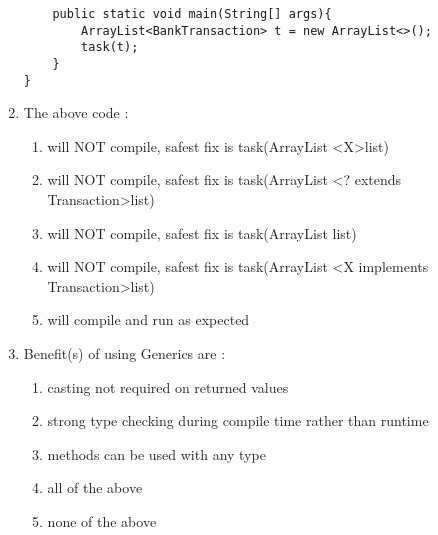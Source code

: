 \documentclass{article}
\begin{document}
\begin{enumerate}
\begin{lstlisting}
	public static void main(String[] args){
		ArrayList<BankTransaction> t = new ArrayList<>();
		task(t);
	}
}
	\end{lstlisting}
	\item The above code :
	\begin{enumerate}
		\item will NOT compile, safest fix is task(ArrayList \textless X\textgreater list)
		\item will NOT compile, safest fix is task(ArrayList \textless ? extends Transaction\textgreater list)
		\item will NOT compile, safest fix is task(ArrayList list)
		\item will NOT compile, safest fix is task(ArrayList \textless X implements Transaction\textgreater list)
		\item will compile and run as expected
	\end{enumerate}
	\item Benefit(s) of using Generics are :
	\begin{enumerate}
		\item casting not required on returned values
		\item strong type checking during compile time rather than runtime
		\item methods can be used with any type
		\item all of the above
		\item none of the above
	\end{enumerate}
\end{enumerate} 
\end{document}
